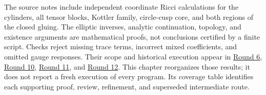 \documentclass[
  english,
]{article}
\begin{document}
The source notes include independent coordinate Ricci calculations for
the cylinders, all tensor blocks, Kottler family, circle-cusp core, and
both regions of the closed gluing. The elliptic inverses, analytic
continuation, topology, and existence arguments are mathematical proofs,
not conclusions certified by a finite script. Checks reject missing
trace terms, incorrect mixed coefficients, and omitted gauge responses.
Their scope and historical execution appear in
\href{../proofs/round6_verification.md}{Round 6},
\href{../proofs/round10_verification.md}{Round 10},
\href{../proofs/round11_verification.md}{Round 11}, and
\href{../proofs/round12_verification.md}{Round 12}. This chapter
reorganizes those results; it does not report a fresh execution of every
program. Its coverage table identifies each supporting proof, review,
refinement, and superseded intermediate route.
\end{document}
